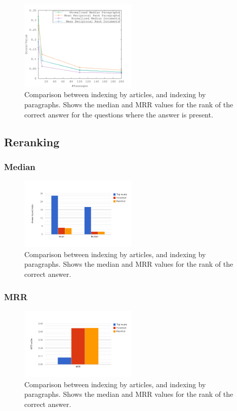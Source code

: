 \begin{figure}[h!]
  \centering
  \includegraphics[width=0.5\textwidth]{figures/median.pdf}
  \caption{Comparison between indexing by articles, and indexing by paragraphs. 
  Shows the median and MRR values for the rank of the correct answer for the questions where 
  the answer is present.}
\end{figure}

\subsection{Reranking}

\subsubsection{Median}


\begin{figure}[h!]
  \centering
  \includegraphics[width=0.5\textwidth]{figures/meanMedian.png}
  \caption{Comparison between indexing by articles, and indexing by paragraphs. 
  Shows the median and MRR values for the rank of the correct answer.}
\end{figure}

\subsubsection{MRR}


\begin{figure}[h!]
  \centering
  \includegraphics[width=0.5\textwidth]{figures/mrr.png}
  \caption{Comparison between indexing by articles, and indexing by paragraphs. 
  Shows the median and MRR values for the rank of the correct answer.}
\end{figure}

